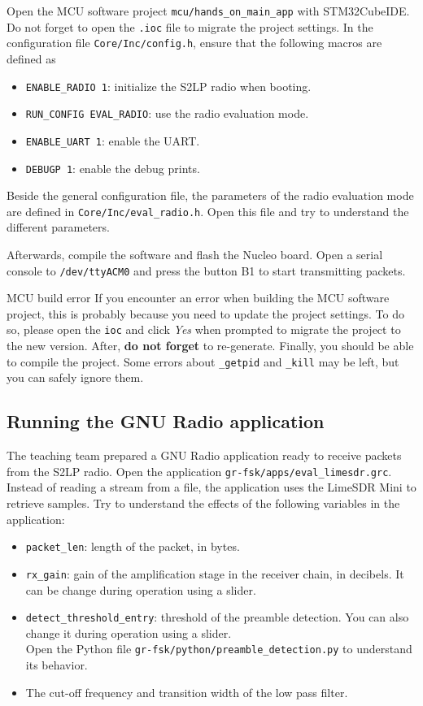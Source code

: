 Open the MCU software project \texttt{mcu/hands\_on\_main\_app} with STM32CubeIDE. Do not forget to open the \texttt{.ioc} file to migrate the project settings.
In the configuration file \texttt{Core/Inc/config.h}, ensure that the following macros are defined as
\begin{itemize}
    \item \texttt{ENABLE\_RADIO 1}: initialize the S2LP radio when booting.
    \item \texttt{RUN\_CONFIG EVAL\_RADIO}: use the radio evaluation mode.
    \item \texttt{ENABLE\_UART 1}: enable the UART.
    \item \texttt{DEBUGP 1}: enable the debug prints.
\end{itemize}

Beside the general configuration file, the parameters of the radio evaluation mode are defined in \texttt{Core/Inc/eval\_radio.h}.
Open this file and try to understand the different parameters.

Afterwards, compile the software and flash the Nucleo board. Open a serial console to \texttt{/dev/ttyACM0} and press the button B1 to start transmitting packets.

\begin{bclogo}[couleur = gray!20, arrondi = 0.2, logo=\bcinfo]{MCU build error}
    If you encounter an error when building the MCU software project, this is probably because you need to update the project settings. To do so, please open the \texttt{ioc} and click \textit{Yes} when prompted to migrate the project to the new version. After, \textbf{do not forget} to re-generate. Finally, you should be able to compile the project. Some errors about \texttt{\_getpid} and \texttt{\_kill} may be left, but you can safely ignore them.
\end{bclogo}

\subsection{Running the GNU Radio application}

The teaching team prepared a GNU Radio application ready to receive packets from the S2LP radio.
Open the application \texttt{gr-fsk/apps/eval\_limesdr.grc}. Instead of reading a stream from a file, the application uses the LimeSDR Mini
to retrieve samples. Try to understand the effects of the following variables in the application:
\begin{itemize}
    \item \texttt{packet\_len}: length of the packet, in bytes.
    \item \texttt{rx\_gain}: gain of the amplification stage in the receiver chain, in decibels. It can be change during operation using a slider.
    \item \texttt{detect\_threshold\_entry}: threshold of the preamble detection. You can also change it during operation using a slider.\\
    Open the Python file \texttt{gr-fsk/python/preamble\_detection.py} to understand its behavior.
    \item The cut-off frequency and transition width of the low pass filter.
\end{itemize}

